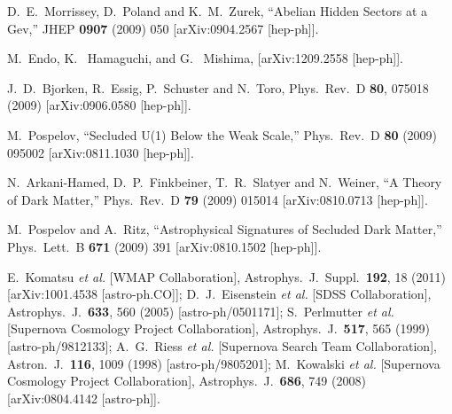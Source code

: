 D.~E.~Morrissey, D.~Poland and K.~M.~Zurek,
``Abelian Hidden Sectors at a Gev,''
JHEP {\bf 0907} (2009) 050
[arXiv:0904.2567 [hep-ph]].

M.~Endo, K.~ Hamaguchi, and G.~ Mishima, [arXiv:1209.2558 [hep-ph]]. 

  J.~D.~Bjorken, R.~Essig, P.~Schuster and N.~Toro,
  Phys.\ Rev.\ D {\bf 80}, 075018 (2009)
  [arXiv:0906.0580 [hep-ph]].

M.~Pospelov,
``Secluded U(1) Below the Weak Scale,''
Phys.\ Rev.\ D {\bf 80} (2009) 095002
[arXiv:0811.1030 [hep-ph]].

N.~Arkani-Hamed, D.~P.~Finkbeiner, T.~R.~Slatyer and N.~Weiner,
``A Theory of Dark Matter,''
Phys.\ Rev.\ D {\bf 79} (2009) 015014
[arXiv:0810.0713 [hep-ph]].

M.~Pospelov and A.~Ritz,
``Astrophysical Signatures of Secluded Dark Matter,''
Phys.\ Lett.\ B {\bf 671} (2009) 391
[arXiv:0810.1502 [hep-ph]].


  E.~Komatsu {\it et al.}  [WMAP Collaboration],
  Astrophys.\ J.\ Suppl.\  {\bf 192}, 18 (2011)
  [arXiv:1001.4538 [astro-ph.CO]];
  D.~J.~Eisenstein {\it et al.}  [SDSS Collaboration],
  Astrophys.\ J.\  {\bf 633}, 560 (2005)
  [astro-ph/0501171];
  S.~Perlmutter {\it et al.}  [Supernova Cosmology Project Collaboration],
  Astrophys.\ J.\  {\bf 517}, 565 (1999)
  [astro-ph/9812133];
  A.~G.~Riess {\it et al.}  [Supernova Search Team Collaboration],
  Astron.\ J.\  {\bf 116}, 1009 (1998)
  [astro-ph/9805201];
  M.~Kowalski {\it et al.}  [Supernova Cosmology Project Collaboration],
  Astrophys.\ J.\  {\bf 686}, 749 (2008)
  [arXiv:0804.4142 [astro-ph]].

